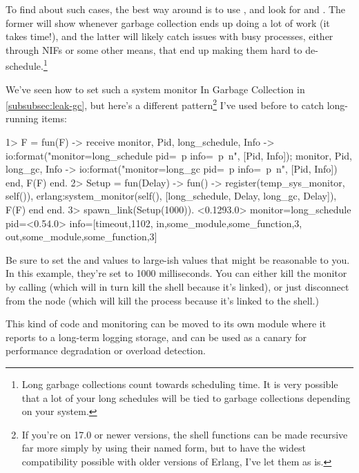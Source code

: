 To find about such cases, the best way around is to use , and look for  and . The former will show whenever garbage collection ends up doing a lot of work (it takes time!), and the latter will likely catch issues with busy processes, either through NIFs or some other means, that end up making them hard to de-schedule.\footnote{Long garbage collections count towards scheduling time. It is very possible that a lot of your long schedules will be tied to garbage collections depending on your system.}

We've seen how to set such a system monitor In Garbage Collection in \ref{subsubsec:leak-gc}, but here's a different pattern\footnote{If you're on 17.0 or newer versions, the shell functions can be made recursive far more simply by using their named form, but to have the widest compatibility possible with older versions of Erlang, I've let them as is.} I've used before to catch long-running items:

\begin{VerbatimEshell}
1> F = fun(F) ->
    receive
        {monitor, Pid, long_schedule, Info} ->
            io:format("monitor=long_schedule pid=~p info=~p~n", [Pid, Info]);
        {monitor, Pid, long_gc, Info} -> 
            io:format("monitor=long_gc pid=~p info=~p~n", [Pid, Info])
    end,
    F(F)
end.
2> Setup = fun(Delay) -> fun() -> 
     register(temp_sys_monitor, self()),
     erlang:system_monitor(self(), [{long_schedule, Delay}, {long_gc, Delay}]),
     F(F)
end end.
3> spawn_link(Setup(1000)).
<0.1293.0>
monitor=long_schedule pid=<0.54.0> info=[{timeout,1102},
                                         {in,{some_module,some_function,3}},
                                         {out,{some_module,some_function,3}}]
\end{VerbatimEshell}

Be sure to set the  and  values to large-ish values that might be reasonable to you. In this example, they're set to 1000 milliseconds. You can either kill the monitor by calling  (which will in turn kill the shell because it's linked), or just disconnect from the node (which will kill the process because it's linked to the shell.)

This kind of code and monitoring can be moved to its own module where it reports to a long-term logging storage, and can be used as a canary for performance degradation or overload detection.

